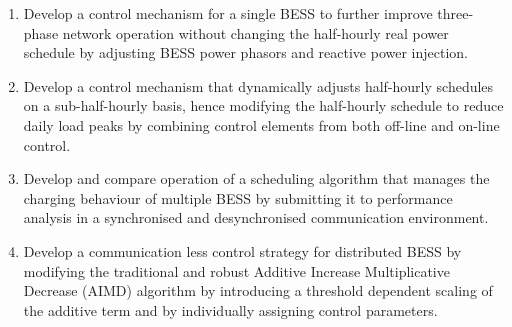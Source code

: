 \begin{enumerate}[
labelindent=*,
style=multiline,
leftmargin=*,
label=\textbf{Objective~\arabic*}
]
	\item \label{objective-1} Develop a control mechanism for a single BESS to further improve three-phase network operation without changing the half-hourly real power schedule by adjusting BESS power phasors and reactive power injection.
	\item \label{objective-2} Develop a control mechanism that dynamically adjusts half-hourly schedules on a sub-half-hourly basis, hence modifying the half-hourly schedule to reduce daily load peaks by combining control elements from both off-line and on-line control.
	\item \label{objective-3} Develop and compare operation of a scheduling algorithm that manages the charging behaviour of multiple BESS by submitting it to performance analysis in a synchronised and desynchronised communication environment.
	\item \label{objective-4} Develop a communication less control strategy for distributed BESS by modifying the traditional and robust Additive Increase Multiplicative Decrease (AIMD) algorithm by introducing a threshold dependent scaling of the additive term and by individually assigning control parameters.
\end{enumerate}

